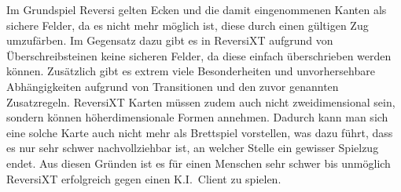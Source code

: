 Im Grundspiel Reversi gelten Ecken und die damit eingenommenen Kanten als sichere Felder, da es nicht mehr m\"oglich ist, diese durch einen g\"ultigen Zug umzuf\"arben.
Im Gegensatz dazu gibt es in ReversiXT aufgrund von \"Uberschreibsteinen keine sicheren Felder, da diese einfach \"uberschrieben werden k\"onnen.
Zus\"atzlich gibt es extrem viele Besonderheiten und unvorhersehbare Abh\"angigkeiten aufgrund von Transitionen und den zuvor genannten Zusatzregeln.
ReversiXT Karten m\"ussen zudem auch nicht zweidimensional sein, sondern k\"onnen h\"oherdimensionale Formen annehmen.
Dadurch kann man sich eine solche Karte auch nicht mehr als Brettspiel vorstellen, was dazu f\"uhrt, dass es nur sehr schwer nachvollziehbar ist, an welcher Stelle ein gewisser Spielzug endet.
Aus diesen Gr\"unden ist es f\"ur einen Menschen sehr schwer bis unm\"oglich ReversiXT erfolgreich gegen einen K.I.\ Client zu spielen.


